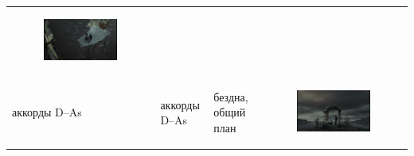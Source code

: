 \begin{longtable}[]{@{}llll@{}}
\begin{minipage}[t]{0.27\columnwidth}
\begin{figure}
\centering
\includegraphics{IMG/LS_HH_suspense.png}
\caption{}
\end{figure}
\strut
\end{minipage}\tabularnewline
\begin{minipage}[t]{0.15\columnwidth}\raggedright\strut
аккорды D--As\strut
\end{minipage} & \begin{minipage}[t]{0.20\columnwidth}\raggedright\strut
аккорды D--As\strut
\end{minipage} & \begin{minipage}[t]{0.27\columnwidth}\raggedright\strut
бездна, общий план\strut
\end{minipage} & \begin{minipage}[t]{0.27\columnwidth}\raggedright\strut
\begin{figure}
\centering
\includegraphics{IMG/LS_HH_Abyss.png}
\caption{}
\end{figure}
\strut
\end{minipage}\tabularnewline
\bottomrule
\end{longtable}

